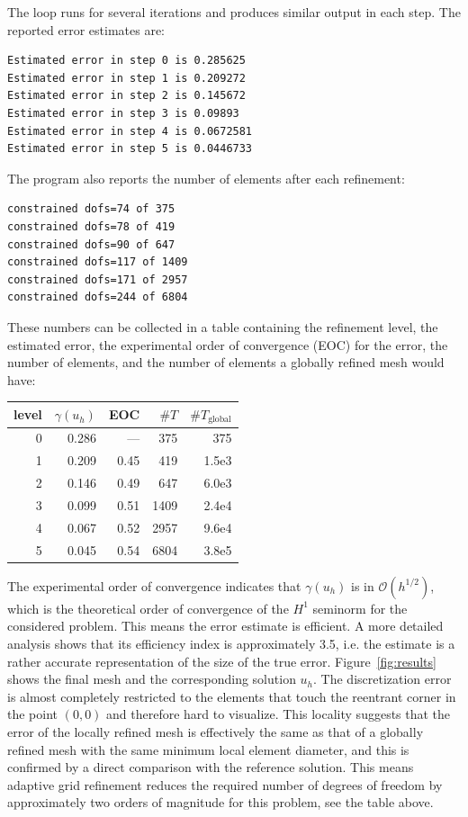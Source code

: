 \documentclass[a4paper,12pt]{article}
\begin{document}
The loop runs for several iterations and produces similar output in
each step. The reported error estimates are:
\begin{lstlisting}[basicstyle=\ttfamily\small,
frame=single,
backgroundcolor=\color{listingbg}]
Estimated error in step 0 is 0.285625
Estimated error in step 1 is 0.209272
Estimated error in step 2 is 0.145672
Estimated error in step 3 is 0.09893
Estimated error in step 4 is 0.0672581
Estimated error in step 5 is 0.0446733
\end{lstlisting}

The program also reports the number of elements after each refinement:
\begin{lstlisting}[basicstyle=\ttfamily\small,
frame=single,
backgroundcolor=\color{listingbg}]
constrained dofs=74 of 375
constrained dofs=78 of 419
constrained dofs=90 of 647
constrained dofs=117 of 1409
constrained dofs=171 of 2957
constrained dofs=244 of 6804
\end{lstlisting}

These numbers can be collected in a table containing the refinement level,
the estimated error, the experimental order of convergence (EOC) for the
error, the number of elements, and the number of elements a globally
refined mesh would have:
\begin{center}
  \begin{tabular}{rrrrr}
    level & $\gamma(u_h)$ & EOC & $\#T$ & $\#T_\text{global}$ \\
    \hline
    0 & 0.286 & ---  &  375 & 375   \\
    1 & 0.209 & 0.45 &  419 & 1.5e3 \\
    2 & 0.146 & 0.49 &  647 & 6.0e3 \\
    3 & 0.099 & 0.51 & 1409 & 2.4e4 \\
    4 & 0.067 & 0.52 & 2957 & 9.6e4 \\
    5 & 0.045 & 0.54 & 6804 & 3.8e5 \\
\end{tabular}
\end{center}

The experimental order of convergence indicates that $\gamma(u_h)$ is in
$\mathcal{O}(h^{1/2})$, which is the theoretical order of convergence of
the $H^1$ seminorm for the considered problem. This means the error
estimate is efficient. A more detailed analysis shows that its efficiency
index is approximately 3.5, i.e. the estimate is a rather accurate
representation of the size of the true error. Figure~\ref{fig:results}
shows the final mesh and the corresponding solution $u_h$. The
discretization error is almost completely restricted to the elements that
touch the reentrant corner in the point $(0,0)$ and therefore hard to
visualize. This locality suggests that the error of the locally refined
mesh is effectively the same as that of a globally refined mesh with the
same minimum local element diameter, and this is confirmed by a direct
comparison with the reference solution. This means adaptive grid refinement
reduces the required number of degrees of freedom by approximately two
orders of magnitude for this problem, see the table above.
\end{document}
